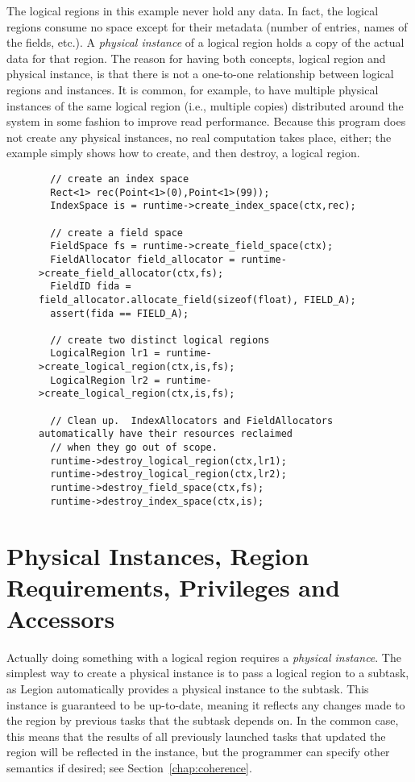 The logical regions in this example never hold any data.  In
fact, the logical regions consume no space except for their metadata
(number of entries, names of the fields, etc.).  A {\em physical
  instance} of a logical region holds a copy of the actual data for
that region.  The reason for having both concepts, logical region and
physical instance, is that there is not a one-to-one relationship
between logical regions and instances.  It is common, for example, to
have multiple physical instances of the same logical region (i.e.,
multiple copies) distributed around the system in some fashion to
improve read performance.  Because this program does not create any
physical instances, no real computation takes place, either; the
example simply shows how to create, and then destroy, a logical
region.

\begin{figure}
{\small
\begin{lstlisting}
  // create an index space
  Rect<1> rec(Point<1>(0),Point<1>(99));
  IndexSpace is = runtime->create_index_space(ctx,rec);

  // create a field space                          
  FieldSpace fs = runtime->create_field_space(ctx);
  FieldAllocator field_allocator = runtime->create_field_allocator(ctx,fs);
  FieldID fida = field_allocator.allocate_field(sizeof(float), FIELD_A);
  assert(fida == FIELD_A);

  // create two distinct logical regions 
  LogicalRegion lr1 = runtime->create_logical_region(ctx,is,fs);
  LogicalRegion lr2 = runtime->create_logical_region(ctx,is,fs);

  // Clean up.  IndexAllocators and FieldAllocators automatically have their resources reclaimed
  // when they go out of scope. 
  runtime->destroy_logical_region(ctx,lr1);
  runtime->destroy_logical_region(ctx,lr2);
  runtime->destroy_field_space(ctx,fs);
  runtime->destroy_index_space(ctx,is);
\end{lstlisting}
}
\caption{}
\label{fig:lr1}
\end{figure}

\section{Physical Instances, Region Requirements, Privileges and Accessors}
\label{sec:privileges}

Actually doing something with a logical region requires a {\em
  physical instance}.  The simplest way to create a physical instance
is to pass a logical region to a subtask, as Legion automatically
provides a physical instance to the subtask.  This instance is
guaranteed to be up-to-date, meaning it reflects any changes made to
the region by previous tasks that the subtask depends on.  In the
common case, this means that the results of all previously launched
tasks that updated the region will be reflected in the instance, but
the programmer can specify other semantics if desired; see
Section~\ref{chap:coherence}.

